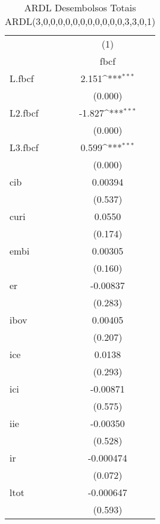\begin{table}[htbp]\centering
\def\sym#1{\ifmmode^{#1}\else\(^{#1}\)\fi}
\caption{ARDL Desembolsos Totais ARDL(3,0,0,0,0,0,0,0,0,0,0,0,3,3,0,1) \label{tab1}}
\begin{tabular}{l*{1}{c}}
\toprule
            &\multicolumn{1}{c}{(1)}\\
            &\multicolumn{1}{c}{fbcf}\\
\midrule
L.fbcf      &       2.151\sym{***}\\
            &     (0.000)         \\
\addlinespace
L2.fbcf     &      -1.827\sym{***}\\
            &     (0.000)         \\
\addlinespace
L3.fbcf     &       0.599\sym{***}\\
            &     (0.000)         \\
\addlinespace
cib         &     0.00394         \\
            &     (0.537)         \\
\addlinespace
curi        &      0.0550         \\
            &     (0.174)         \\
\addlinespace
embi        &     0.00305         \\
            &     (0.160)         \\
\addlinespace
er          &    -0.00837         \\
            &     (0.283)         \\
\addlinespace
ibov        &     0.00405         \\
            &     (0.207)         \\
\addlinespace
ice         &      0.0138         \\
            &     (0.293)         \\
\addlinespace
ici         &    -0.00871         \\
            &     (0.575)         \\
\addlinespace
iie         &    -0.00350         \\
            &     (0.528)         \\
\addlinespace
ir          &   -0.000474         \\
            &     (0.072)         \\
\addlinespace
ltot        &   -0.000647         \\
            &     (0.593)         \\

\end{tabular}
\end{table}
